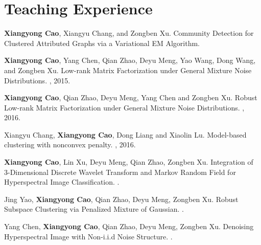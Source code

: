\documentclass[11pt,a4paper,sans]{moderncv}   %
\begin{document}
\section{Teaching Experience}

\begin{thebibliography}{1}
\textbf{Xiangyong Cao}, Xiangyu Chang, and Zongben Xu.
\newblock \textcolor[rgb]{0.00,0.00,1.00}{ Community Detection for Clustered Attributed Graphs via a Variational EM Algorithm.}

\textbf{Xiangyong Cao}, Yang Chen, Qian Zhao, Deyu Meng, Yao Wang, Dong Wang, and Zongben Xu.
\newblock \textcolor[rgb]{0.00,0.00,1.00}{Low-rank Matrix Factorization under General Mixture Noise Distributions.}
, 2015.

\textbf{Xiangyong Cao}, Qian Zhao, Deyu Meng, Yang Chen and Zongben Xu.
\newblock \textcolor[rgb]{0.00,0.00,1.00}{Robust Low-rank Matrix Factorization under General Mixture Noise Distributions.}
, 2016.

Xiangyu Chang, \textbf{Xiangyong Cao}, Dong Liang and Xiaolin Lu.
\newblock \textcolor[rgb]{0.00,0.00,1.00}{ Model-based clustering with nonconvex penalty.}
, 2016.

\textbf{Xiangyong Cao}, Lin Xu, Deyu Meng, Qian Zhao, Zongben Xu.
\newblock \textcolor[rgb]{0.00,0.00,1.00}{Integration of 3-Dimensional Discrete Wavelet Transform and Markov Random Field for Hyperspectral Image Classification.}
.

Jing Yao, \textbf{Xiangyong Cao}, Qian Zhao, Deyu Meng, Zongben Xu.
\newblock \textcolor[rgb]{0.00,0.00,1.00}{Robust Subspace Clustering via Penalized Mixture of Gaussian.}
.

Yang Chen, \textbf{Xiangyong Cao}, Qian Zhao, Deyu Meng,  Zongben Xu.
\newblock \textcolor[rgb]{0.00,0.00,1.00}{Denoising Hyperspectral Image with Non-i.i.d Noise Structure.}
.

\end{thebibliography}
\end{document}
